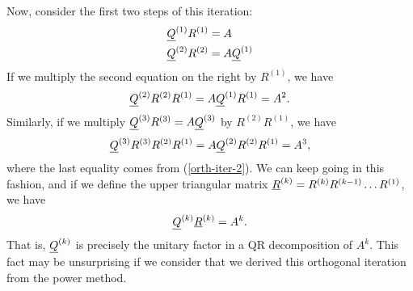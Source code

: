 Now, consider the first two steps of this iteration:
\begin{align*}
  \underline{Q}^{(1)} R^{(1)} &= A \\
  \underline{Q}^{(2)} R^{(2)} &= A \underline{Q}^{(1)}
\end{align*}
If we multiply the second equation on the right by $R^{(1)}$,
we have
\begin{equation} \label{orth-iter-2}
  \underline{Q}^{(2)} R^{(2)} R^{(1)} = A \underline{Q}^{(1)} R^{(1)} = A^2.
\end{equation}
Similarly, if we multiply $\underline{Q}^{(3)} R^{(3)} = A \underline{Q}^{(3)}$ by $R^{(2)} R^{(1)}$,
we have
\[
  \underline{Q}^{(3)} R^{(3)} R^{(2)} R^{(1)} = A \underline{Q}^{(2)} R^{(2)} R^{(1)} = A^3,
\]
where the last equality comes from (\ref{orth-iter-2}).
We can keep going in this fashion, and if we define the
upper triangular matrix
$\underline{R}^{(k)} = R^{(k)} R^{(k-1)} \ldots R^{(1)}$, we have
\[
  \underline{Q}^{(k)} \underline{R}^{(k)} = A^k.
\]
That is, $\underline{Q}^{(k)}$ is precisely the unitary factor in a QR
decomposition of $A^k$.  This fact may be unsurprising if
we consider that we derived this orthogonal iteration from
the power method.
